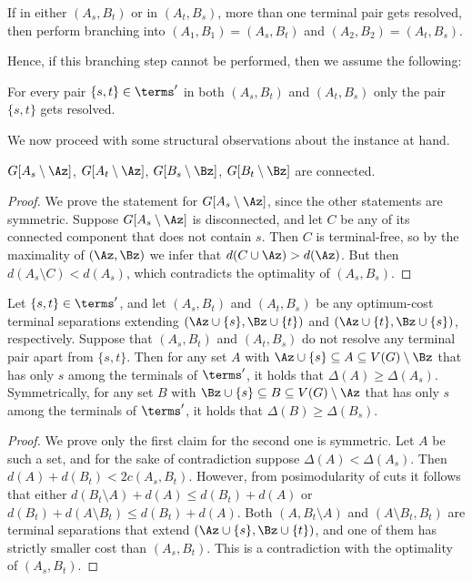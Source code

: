 \begin{branching}\label{br:twopairs}
If in either $(A_s,B_t)$ or in $(A_t,B_s)$, more than one terminal pair gets resolved, then perform branching into $(A_1,B_1)=(A_s,B_t)$ and $(A_2,B_2)=(A_t,B_s)$.
\end{branching}

Hence, if this branching step cannot be performed, then we assume the following:

\begin{assumption}\label{ass:one-pair}
For every pair $\{s,t\}\in \terms'$ in both $(A_s,B_t)$ and $(A_t,B_s)$ only the pair $\{s,t\}$ gets resolved.
\end{assumption}

We now proceed with some structural observations about the instance at hand.

\begin{lemma}\label{lem:AsConn}
$G[A_s\setminus \Az]$, $G[A_t\setminus \Az]$, $G[B_s\setminus \Bz]$, $G[B_t\setminus \Bz]$ are connected.
\end{lemma}
\begin{proof}
We prove the statement for $G[A_s\setminus \Az]$, since the other statements are symmetric. Suppose $G[A_s\setminus \Az]$ is disconnected, and let $C$ be any of its connected component that does not contain $s$. Then $C$ is terminal-free, so by the maximality of $(\Az,\Bz)$ we infer that $d(C\cup \Az)>d(\Az)$. But then $d(A_s\setminus C)<d(A_s)$, which contradicts the optimality of $(A_s,B_s)$.
\end{proof}

\begin{lemma}\label{lem:lb}
Let $\{s,t\}\in \terms'$, and let $(A_s,B_t)$ and $(A_t,B_s)$ be any optimum-cost terminal separations extending $(\Az\cup\{s\},\Bz\cup \{t\})$ and $(\Az\cup\{t\},\Bz\cup \{s\})$, respectively. Suppose that $(A_s,B_t)$ and $(A_t,B_s)$ do not resolve any terminal pair apart from $\{s,t\}$. Then for any set $A$ with $\Az\cup\{s\}\subseteq A\subseteq V(G)\setminus \Bz$ that has only $s$ among the terminals of $\terms'$, it holds that $\Delta(A)\geq \Delta(A_s)$. Symmetrically, for any set $B$ with $\Bz\cup\{s\}\subseteq B\subseteq V(G)\setminus \Az$ that has only $s$ among the terminals of $\terms'$, it holds that $\Delta(B)\geq \Delta(B_s)$.
\end{lemma}
\begin{proof}
We prove only the first claim for the second one is symmetric. Let $A$ be such a set, and for the sake of contradiction suppose $\Delta(A)<\Delta(A_s)$. Then $d(A)+d(B_t)<2c(A_s,B_t)$. However, from posimodularity of cuts it follows that either $d(B_t\setminus A)+d(A)\leq d(B_t)+d(A)$ or $d(B_t)+d(A\setminus B_t)\leq d(B_t)+d(A)$. Both $(A,B_t\setminus A)$ and $(A\setminus B_t,B_t)$ are terminal separations that extend $(\Az\cup\{s\},\Bz\cup \{t\})$, and one of them has strictly smaller cost than $(A_s,B_t)$. This is a contradiction with the optimality of $(A_s,B_t)$.
\end{proof}

